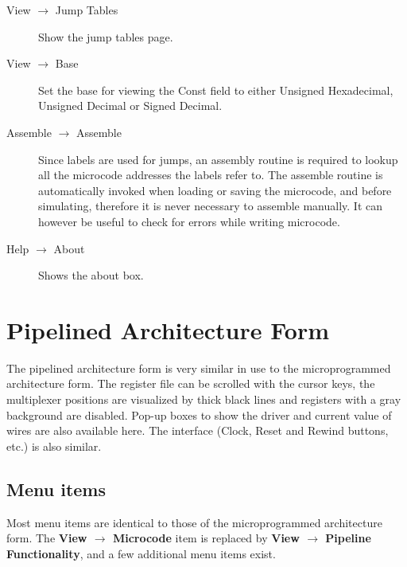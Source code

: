 \documentclass{article}
\begin{document}
\begin{description}
\item[View $\to$ Jump Tables] Show the jump tables page.
\item[View $\to$ Base] Set the base for viewing the Const field to either Unsigned Hexadecimal, Unsigned Decimal or Signed Decimal.
\item[Assemble $\to$ Assemble] Since labels are used 
for jumps, an assembly routine is required to lookup all the microcode 
addresses the labels refer to. The assemble routine is automatically 
invoked when loading or saving the microcode, and before simulating, 
therefore it is never necessary to assemble manually. It can however be 
useful to check for errors while writing microcode.
\item[Help $\to$ About] Shows the about box.
\end{description}

\section{Pipelined Architecture Form}
The pipelined architecture form is very similar in use to the 
microprogrammed architecture form. The register file can be scrolled 
with the cursor keys, the multiplexer positions are visualized by thick 
black lines and registers with a gray background are disabled. Pop-up 
boxes to show the driver and current value of wires are also available 
here. The interface (Clock, Reset and Rewind buttons, etc.) is also 
similar.

\subsection{Menu items}
Most menu items are identical to those of the microprogrammed architecture form. The \textbf{View $\to$ Microcode} item is replaced by \textbf{View $\to$ Pipeline Functionality}, and a few additional menu items exist.
\end{document}

